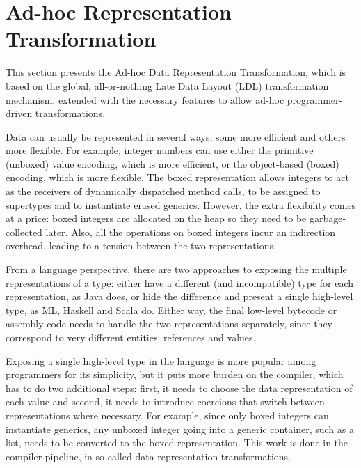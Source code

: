 \section{Ad-hoc Representation Transformation}
\label{sec:ildl}

This section presents the Ad-hoc Data Representation Transformation, which is based on the global, all-or-nothing Late Data Layout (LDL) transformation mechanism, extended with the necessary features to allow ad-hoc programmer-driven transformations.

Data can usually be represented in several ways, some more efficient and others more flexible. For example, integer numbers can use either the primitive (unboxed) value encoding, which is more efficient, or the object-based (boxed) encoding, which is more flexible. The boxed representation allows integers to act as the receivers of dynamically dispatched method calls, to be assigned to supertypes and to instantiate erased generics. However, the extra flexibility comes at a price: boxed integers are allocated on the heap so they need to be garbage-collected later. Also, all the operations on boxed integers incur an indirection overhead, leading to a tension between the two representations.

From a language perspective, there are two approaches to exposing the multiple representations of a type: either have a different (and incompatible) type for each representation, as Java does, or hide the difference and present a single high-level type, as ML, Haskell and Scala do. Either way, the final low-level bytecode or assembly code needs to handle the two representations separately, since they correspond to very different entities: references and values.

Exposing a single high-level type in the language is more popular among programmers for its simplicity, but it puts more burden on the compiler, which has to do two additional steps: first, it needs to choose the data representation of each value and second, it needs to introduce coercions that switch between representations where necessary. For example, since only boxed integers can instantiate generics, any unboxed integer going into a generic container, such as a list, needs to be converted to the boxed representation. This work is done in the compiler pipeline, in so-called data representation transformations.


